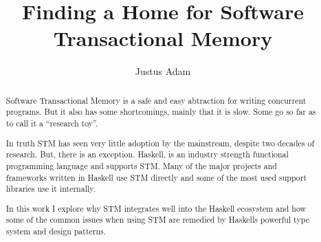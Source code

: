 \documentclass[10pt,a4paper,sigconf]{acmart}
\begin{document}
\title{Finding a Home for Software Transactional Memory}

\author{Justus Adam}


\begin{abstract}
  Software Transactional Memory is a safe and easy abtraction for writing
  concurrent programs. But it also has some shortcomings, mainly that it is
  slow. Some go so far as to call it a ``research toy''\cite{research-toy}.

  In truth STM has seen very little adoption by the mainstream, despite two
  decades of research. But, there is an exception. Haskell, is an industry
  strength functional programming language and supports STM. Many of the major
  projects and frameworks written in Haskell use STM directly and some of the
  most used support libraries use it internally.

  In this work I explore why STM integrates well into the Haskell ecosystem and
  how some of the common issues when using STM are remedied by Haskells powerful
  type system and design patterns.
\end{abstract}

\maketitle












\end{document}
